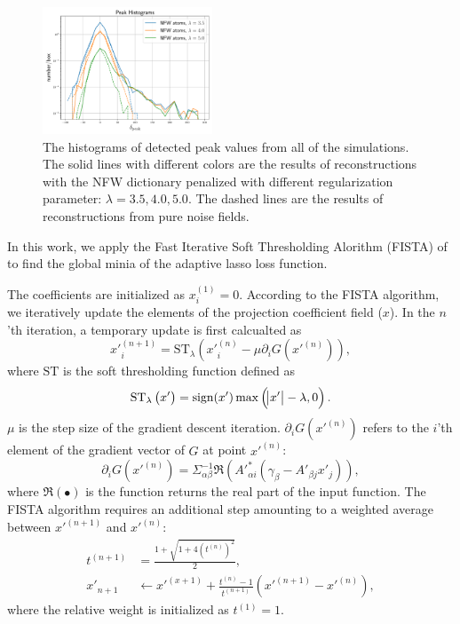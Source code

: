 \documentclass[twocolumn]{aastex62}
\begin{document}
\begin{figure}[!t]
 \centering
 \includegraphics[width=0.45\textwidth]{peak_histograms.pdf}
 \caption{The histograms of detected peak values from all of the simulations. The solid lines with different colors 
        are the results of reconstructions with the NFW dictionary penalized with different regularization parameter:
        $\lambda=3.5,4.0,5.0$. The dashed lines are the results of reconstructions from pure noise fields.
        }\label{fig-peakHist}
\end{figure}

In this work, we apply the Fast Iterative Soft Thresholding Alorithm (FISTA) of \citet{FISTA-Beck2009} to find the global minia
of the adaptive lasso loss function.

The coefficients are initialized as $x_i^{(1)}=0$. According to the FISTA algorithm, we iteratively update the elements of the 
projection coefficient field ($x$). In the $n$'th iteration, a temporary update is first calcualted as
\begin{equation}
x'^{(n+1)}_{i}=\mathrm{ST}_{\lambda} \left(x'^{(n)}_{i} -\mu \partial_i G(x'^{(n)})\right),
\end{equation}
where $\mathrm{ST}$ is the soft thresholding function defined as
\begin{equation}
\mathrm{ST}_{\lambda} \left(x'\right) = \mathrm{sign} (x') \max \left(\abs{x'}-\lambda,0\right).
\end{equation}
$\mu$ is the step size of the gradient descent iteration.
$\partial_i G(x'^{(n)})$ refers to the $i$'th element of the gradient
vector of $G$ at point $x'^{(n)}$:
\begin{equation}
\partial_i G(x'^{(n)})=\Sigma^{-1}_{\alpha\beta}\Re\left(A'^{*}_{\alpha i}(\gamma_{\beta}-A'_{\beta j}x'_{j})\right),
\end{equation}
where $\Re\left( \bullet \right)$ is the function returns the real part of the input function.
The FISTA algorithm requires an additional step amounting to a weighted average between
$x'^{(n+1)}$ and $x'^{(n)}$:
\begin{equation}
\begin{split}
t^{(n+1)}&=\frac{1+\sqrt{1+4(t^{(n)})^2}}{2},\\
x'_{n+1} &\leftarrow x'^{(x+1)}+ \frac{t^{(n)}-1}{t^{(n+1)}}(x'^{(n+1)}-x'^{(n)}),
\end{split}
\end{equation}
where the relative weight is initialized as $t^{(1)}=1$.
\end{document}
